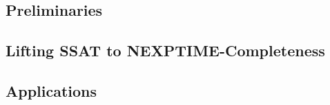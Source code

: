 \subsection{Preliminaries}

\subsection{Lifting SSAT to NEXPTIME-Completeness}



\subsection{Applications}

